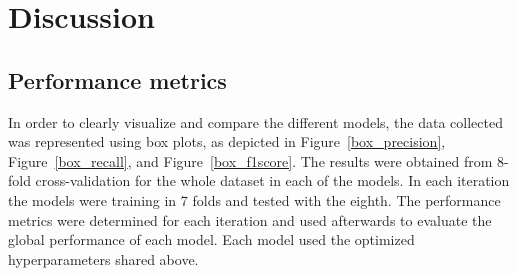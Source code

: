 \documentclass[conference]{IEEEtran}
\begin{document}
\section{Discussion}

\subsection{Performance metrics}

In order to clearly visualize and compare the different models, the data collected was represented using box plots, as depicted in Figure~\ref{box_precision}, Figure~\ref{box_recall}, and Figure~\ref{box_f1score}.
The results were obtained from 8-fold cross-validation for the whole dataset in each of the models. In each iteration the models were training in 7 folds and tested with the eighth. The performance metrics were determined for each iteration and used afterwards to evaluate the global performance of each model. Each model used the optimized hyperparameters shared above.
\end{document}
